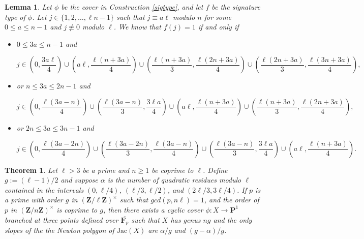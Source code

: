 \documentclass[10pt,a4paper]{amsart}
\newtheorem{theorem}{Theorem}
\newtheorem{lemma}{Lemma}
\begin{document}
\begin{lemma}
    \label{intervals}
    Let $\phi$ be the cover in Construction \ref{sigtype}, and let $f$ be the signature type of $\phi$. Let $j \in \{1,2,\ldots,\ell n-1\}$ such that $j \equiv a\ell$ modulo $n$ for some $0 \leq a \leq n-1$ and $j \not \equiv 0$ modulo $\ell$. We know that $f(j) = 1$ if and only if
    \begin{itemize}

   
    \item $0 \leq 3a \leq n-1$ and
    
    \[
        j \in \left(0, \frac{3a\ell}{4}\right) \cup \left(a\ell, \frac{\ell(n+3a)}{4} \right) \cup \left(\frac{\ell(n+3a)}{3}, \frac{\ell(2n+3a)}{4} \right) \cup \left(\frac{\ell(2n+3a)}{3}, \frac{\ell(3n+3a)}{4} \right),
    \]
    
    \item or $n \leq 3a \leq 2n-1$ and

    \[
        j \in \left(0, \frac{\ell(3a-n)}{4}\right) \cup \left(\frac{\ell(3a-n)}{3}, \frac{3\ell a}{4} \right) \cup  \left(a\ell, \frac{\ell(n+3a)}{4} \right) \cup  \left(\frac{\ell(n+3a)}{3}, \frac{\ell(2n+3a)}{4} \right),
    \]
    
    \item or $2n \leq 3a \leq 3n-1$ and
   
    \[
       j \in \left(0, \frac{\ell(3a-2n)}{4}\right) \cup \left(\frac{\ell(3a-2n)}{3}, \frac{\ell(3a-n)}{4} \right) \cup  \left(\frac{\ell(3a-n)}{3}, \frac{3\ell a}{4} \right) \cup  \left(a\ell, \frac{\ell(n+3a)}{4} \right).
    \]
     \end{itemize}
\end{lemma}

\begin{theorem}
\label{slopes}
Let $\ell > 3$ be a prime and $n \geq 1$ be coprime to $\ell$. Define $g := (\ell-1)/2$ and suppose $\alpha$ is the number of quadratic residues modulo $\ell$ contained in the intervals $(0,\ell/4)$, $(\ell/3,\ell/2)$, and $(2\ell/3, 3\ell/4)$. If $p$ is a prime with order $g$ in $\left (\mathbf{Z}/\ell\mathbf{Z} \right)^\times$ such that $gcd(p,n\ell) = 1$, and the order of $p$ in $\left (\mathbf{Z}/n\mathbf{Z} \right)^\times$ is coprime to $g$, then there exists a cyclic cover $\phi: X \to \mathbf{P}^1$ branched at three points defined over $\overline{\mathbf{F}_p}$ such that $X$ has genus $ng$ and the only slopes of the the Newton polygon of $\textrm{Jac}(X)$ are $\alpha/g$ and $(g-\alpha)/g$.
\end{theorem}
\end{document}
